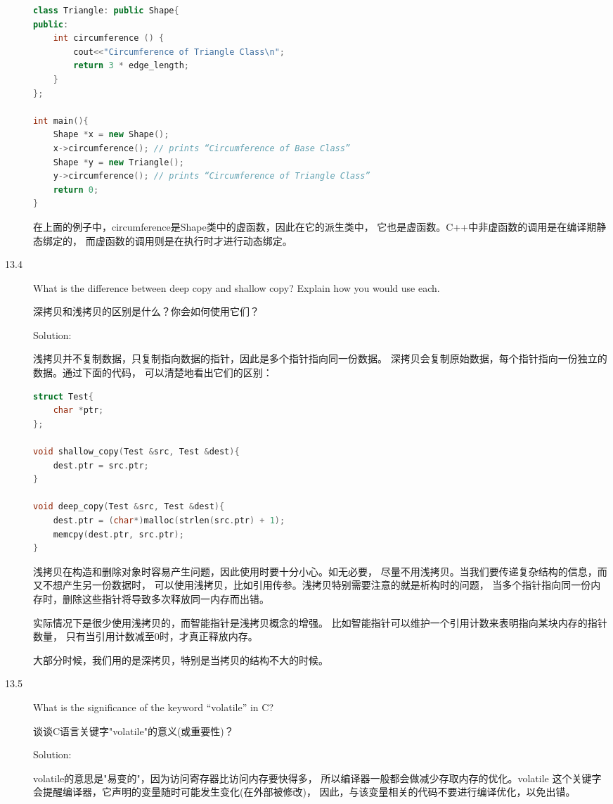 \begin{description}
\begin{lstlisting}[language=C++]
class Triangle: public Shape{
public:
    int circumference () {
        cout<<"Circumference of Triangle Class\n";
        return 3 * edge_length;
    }
};

int main(){
    Shape *x = new Shape();
    x->circumference(); // prints “Circumference of Base Class”
    Shape *y = new Triangle();
    y->circumference(); // prints “Circumference of Triangle Class”
    return 0;
}
\end{lstlisting}
在上面的例子中，circumference是Shape类中的虚函数，因此在它的派生类中， 它也是虚函数。C++中非虚函数的调用是在编译期静态绑定的， 而虚函数的调用则是在执行时才进行动态绑定。


\item[13.4] What is the difference between deep copy and shallow copy? Explain how you would use each.

深拷贝和浅拷贝的区别是什么？你会如何使用它们？

Solution: 

浅拷贝并不复制数据，只复制指向数据的指针，因此是多个指针指向同一份数据。 深拷贝会复制原始数据，每个指针指向一份独立的数据。通过下面的代码， 可以清楚地看出它们的区别：
\begin{lstlisting}[language=C++]
struct Test{
    char *ptr;
};

void shallow_copy(Test &src, Test &dest){
    dest.ptr = src.ptr;
}

void deep_copy(Test &src, Test &dest){
    dest.ptr = (char*)malloc(strlen(src.ptr) + 1);
    memcpy(dest.ptr, src.ptr);
}
\end{lstlisting}
浅拷贝在构造和删除对象时容易产生问题，因此使用时要十分小心。如无必要， 尽量不用浅拷贝。当我们要传递复杂结构的信息，而又不想产生另一份数据时， 可以使用浅拷贝，比如引用传参。浅拷贝特别需要注意的就是析构时的问题， 当多个指针指向同一份内存时，删除这些指针将导致多次释放同一内存而出错。

实际情况下是很少使用浅拷贝的，而智能指针是浅拷贝概念的增强。 比如智能指针可以维护一个引用计数来表明指向某块内存的指针数量， 只有当引用计数减至0时，才真正释放内存。

大部分时候，我们用的是深拷贝，特别是当拷贝的结构不大的时候。


\item[13.5] What is the significance of the keyword “volatile” in C?

谈谈C语言关键字"volatile"的意义(或重要性)？

Solution: 

volatile的意思是"易变的"，因为访问寄存器比访问内存要快得多， 所以编译器一般都会做减少存取内存的优化。volatile 这个关键字会提醒编译器，它声明的变量随时可能发生变化(在外部被修改)， 因此，与该变量相关的代码不要进行编译优化，以免出错。


\end{description}
